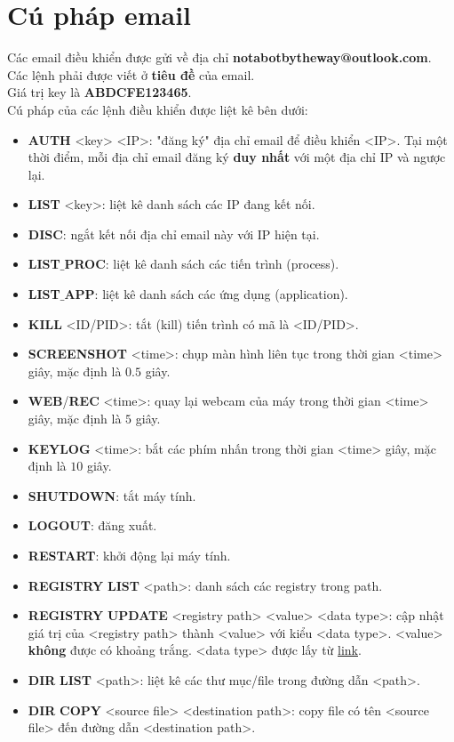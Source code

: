 \section{Cú pháp email}
Các email điều khiển được gửi về địa chỉ \textbf{notabotbytheway@outlook.com}.\\ 
Các lệnh phải được viết ở \textbf{tiêu đề} của email.\\
Giá trị key là \textbf{ABDCFE123465}.\\
Cú pháp của các lệnh điều khiển được liệt kê bên dưới:
\begin{itemize}
\item \textbf{AUTH} <key> <IP>: "đăng ký" địa chỉ email để điều khiển <IP>. Tại một thời điểm, mỗi địa chỉ email đăng ký \textbf{duy nhất} với một địa chỉ IP và ngược lại.
\item \textbf{LIST} <key>: liệt kê danh sách các IP đang kết nối.
\item \textbf{DISC}: ngắt kết nối địa chỉ email này với IP hiện tại.
\item \textbf{LIST}$\_$\textbf{PROC}: liệt kê danh sách các tiến trình (process).
\item \textbf{LIST}$\_$\textbf{APP}: liệt kê danh sách các ứng dụng (application).
\item \textbf{KILL} <ID/PID>: tắt (kill) tiến trình có mã là <ID/PID>.
\item \textbf{SCREENSHOT} <time>: chụp màn hình liên tục trong thời gian <time> giây, mặc định là $0.5$ giây.
\item \textbf{WEB}/\textbf{REC} <time>: quay lại webcam của máy trong thời gian <time> giây, mặc định là $5$ giây. 
\item \textbf{KEYLOG} <time>: bắt các phím nhấn trong thời gian <time> giây, mặc định là $10$ giây.
\item \textbf{SHUTDOWN}: tắt máy tính.
\item \textbf{LOGOUT}: đăng xuất. %
\item \textbf{RESTART}: khởi động lại máy tính.
\item \textbf{REGISTRY} \textbf{LIST} <path>: danh sách các registry trong path.
\item \textbf{REGISTRY} \textbf{UPDATE} <registry path> <value> <data type>: cập nhật giá trị của <registry path> thành <value> với kiểu <data type>. <value> \textbf{không} được có khoảng trắng. <data type> được lấy từ \href{https://docs.microsoft.com/en-us/windows/win32/sysinfo/registry-value-types}{link}.
\item \textbf{DIR} \textbf{LIST} <path>: liệt kê các thư mục/file trong đường dẫn <path>.
\item \textbf{DIR} \textbf{COPY} <source file> <destination path>: copy file có tên <source file> đến đường dẫn <destination path>.
\end{itemize}